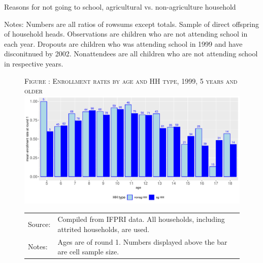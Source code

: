 \documentclass[12pt,letterpaper]{article}\usepackage[margin=1in]{geometry}
\newcommand{\0}{\ensuremath{\mbox{\boldmath $0$}}}
\begin{document}
{\begin{table}
\end{table}



\begin{table}
\caption{Reasons for not going to school, agricultural vs. non-agriculture household}
\label{reasons2}

\hfil

\vspace{2ex}
\hfil\begin{minipage}{16cm}\footnotesize Notes: Numbers are all ratios of rowsums except totals. Sample of direct offspring of household heads. Observations are children who are not attending school in each year. Dropouts are children who was attending school in 1999 and have disconitnued by 2002. Nonattendees are all children who are not attending school in respective years. \end{minipage}
\end{table}



\begin{figure}[h!]
\hfil\textsc{\footnotesize Figure \thefigure: Enrollment rates by age and HH type, 1999, 5 years and older\label{ERbyAge rawdata}}\\
\hfil \includegraphics[width=.7\paperwidth]{Figures/AgewiseRawEnrollmentRates.pdf}\\
\renewcommand{\arraystretch}{1}
\hfil\begin{tabular}{>{\hfill\scriptsize}p{1cm}<{}>{\scriptsize}p{12cm}<{\hfill}}
Source:& Compiled from IFPRI data. All households, including attrited households, are used.\\[-1ex]
Notes:& Ages are of round 1. Numbers displayed above the bar are cell sample size. \\[-1ex]
\end{tabular}
\end{figure}

}
\end{document}
